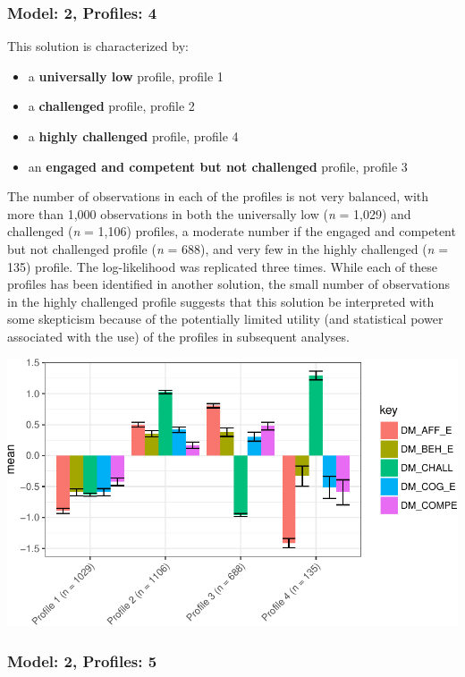 \documentclass[]{book}
\providecommand{\tightlist}{%
  \setlength{\itemsep}{0pt}\setlength{\parskip}{0pt}}
\theoremstyle{definition}
\theoremstyle{definition}
\theoremstyle{definition}
\theoremstyle{remark}
\begin{document}
\subsubsection{Model: 2, Profiles: 4}\label{model-2-profiles-4}

This solution is characterized by:

\begin{itemize}
\tightlist
\item
  a \textbf{universally low} profile, profile 1
\item
  a \textbf{challenged} profile, profile 2
\item
  a \textbf{highly challenged} profile, profile 4
\item
  an \textbf{engaged and competent but not challenged} profile, profile
  3
\end{itemize}

The number of observations in each of the profiles is not very balanced,
with more than 1,000 observations in both the universally low (\emph{n}
= 1,029) and challenged (\emph{n} = 1,106) profiles, a moderate number
if the engaged and competent but not challenged profile (\emph{n} =
688), and very few in the highly challenged (\emph{n} = 135) profile.
The log-likelihood was replicated three times. While each of these
profiles has been identified in another solution, the small number of
observations in the highly challenged profile suggests that this
solution be interpreted with some skepticism because of the potentially
limited utility (and statistical power associated with the use) of the
profiles in subsequent analyses.

\begin{center}\includegraphics[width=0.8\linewidth]{rosenberg-dissertation_files/figure-latex/m2_4p-1} \end{center}

\subsubsection{Model: 2, Profiles: 5}\label{model-2-profiles-5}
\end{document}
